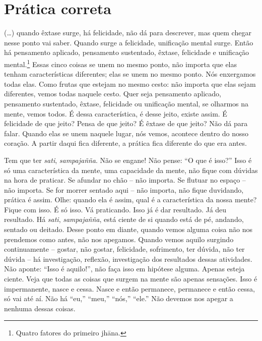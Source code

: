 
\chapter{Prática correta}
\markright{\theChapterAuthor}

(…) quando êxtase surge, há felicidade, não dá para descrever, mas
quem chegar nesse ponto vai saber. Quando surge a felicidade,
unificação mental surge. Então há pensamento aplicado, pensamento
sustentado, êxtase, felicidade e unificação mental.\footnote{Quatro
fatores do primeiro jhāna.} Essas cinco coisas se unem no mesmo
ponto, não importa que elas tenham características diferentes; elas se
unem no mesmo ponto. Nós enxergamos todas elas. Como frutas que estejam
no mesmo cesto: não importa que elas sejam diferentes, vemos todas
naquele cesto. Quer seja pensamento aplicado, pensamento sustentado,
êxtase, felicidade ou unificação mental, se olharmos na mente, vemos
todos. É dessa característica, é desse jeito, existe assim. É
felicidade de que jeito? Pensa de que jeito? É êxtase de que jeito? Não
dá para falar. Quando elas se unem naquele lugar, nós vemos, acontece
dentro do nosso coração. A partir daqui fica diferente, a prática fica
diferente do que era antes.

Tem que ter \textit{sati}, \textit{sampajañña}. Não se engane! Não
pense: “O que é isso?” Isso é só uma característica da mente, uma
capacidade da mente, não fique com dúvidas na hora de praticar. Se
afundar no chão – não importa. Se flutuar no espaço – não importa. Se
for morrer sentado aqui – não importa, não fique duvidando, prática é
assim. Olhe: quando ela é assim, qual é a característica da nossa
mente? Fique com isso. É só isso. Vá praticando. Isso já é dar
resultado. Já deu resultado. Há \textit{sati}, \textit{sampajañña},
está ciente de si quando está de pé, andando, sentado ou deitado. Desse
ponto em diante, quando vemos alguma coisa não nos prendemos como
antes, não nos apegamos. Quando vemos aquilo surgindo continuamente –
gostar, não gostar, felicidade, sofrimento, ter dúvida, não ter dúvida
– há investigação, reflexão, investigação dos resultados dessas
atividades. Não aponte: “Isso é aquilo!”, não faça isso em hipótese
alguma. Apenas esteja ciente. Veja que todas as coisas que surgem na
mente são apenas sensações. Isso é impermanente, nasce e cessa. Nasce e
então permanece, permanece e então cessa, só vai até aí. Não há “eu,”
“meu,” “nós,” “ele.” Não devemos nos apegar a nenhuma dessas coisas. 

